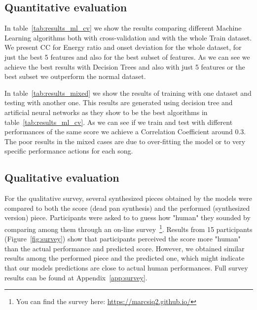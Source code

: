 \subsection{Quantitative evaluation}
In table~\ref{tab:results_ml_cv} we show the results comparing different Machine Learning algorithms both with cross-validation and with the whole Train dataset. We present CC for Energy ratio and onset deviation for the whole dataset, for just the best 5 features and also for the best subset of features. As we can see we achieve the best results with Decision Trees and also with just 5 features or the best subset we outperform the normal dataset.


%
In table~\ref{tab:results_mixed} we show the results of training with one dataset and testing with another one. This results are generated using decision tree and artificial neural networks as they show to be the best algorithms in table~\ref{tab:results_ml_cv}. As we can see if we train and test with different performances of the same score we achieve a Correlation Coefficient around 0.3. The poor results in the mixed cases are due to over-fitting the model or to very specific performance actions for each song.


\subsection{Qualitative evaluation}

For the qualitative survey, several synthesized pieces obtained by the models were compared to both the score (dead pan synthesis) and the performed (synthesized version) piece. Participants were asked to to guess how "human" they sounded by comparing among them through an on-line survey~\footnote{You can find the survey here: \url{https://marcsiq2.github.io/}}. Results from 15 participants (Figure~\ref{fig:survey}) show that participants perceived the score more "human" than the actual performance and predicted score. However, we obtained similar results among the performed piece and the predicted one, which might indicate that our models predictions are close to actual human performances. Full survey results can be found at Appendix~\ref{app:survey}.


